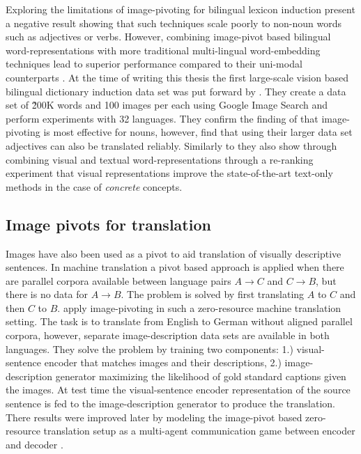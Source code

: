Exploring the limitations of image-pivoting for bilingual lexicon induction
\cite{hartmann2017limitations} present a negative result
showing that such techniques scale poorly to non-noun words such as
adjectives or verbs. However, combining image-pivot based bilingual
word-representations with more traditional multi-lingual word-embedding
techniques lead to superior performance compared to their uni-modal
counterparts \cite{vulic2016multi}. At the time of writing this thesis
the first large-scale vision based bilingual dictionary induction data set
was put forward by \citep{hewitt2018learning}. They create a data set
of \~200K words and 100 images per each using Google Image Search and perform
experiments with 32 languages.
They confirm the finding of \cite{hartmann2017limitations} that image-pivoting
is most effective for nouns, however, find that using their larger data set
adjectives can also be translated reliably. Similarly to \cite{vulic2016multi}
they also show through combining
visual and textual word-representations through a re-ranking
experiment that visual representations improve the state-of-the-art
text-only methods in the case of \emph{concrete} concepts.

\subsection{Image pivots for translation}
\label{sec:imgpivot}

Images have also been used as a pivot to aid translation of visually
descriptive sentences. In machine translation a pivot based approach is applied
when there are parallel corpora available between language pairs $A\rightarrow C$
and $C \rightarrow B$, but there is no data for $A\rightarrow B$. The problem is
solved by first translating $A$ to $C$ and then $C$ to $B$.
\cite{nakayama2017zero} apply image-pivoting in such a zero-resource machine
translation setting. The task is to translate from English to German without
aligned parallel corpora, however, separate image-description data sets are
available in both languages. They solve the problem by
training two components: 1.) visual-sentence encoder that matches images and their descriptions,
2.) image-description generator maximizing the likelihood of gold standard captions given the images.
At test time the visual-sentence encoder representation of the source sentence is fed to the
image-description generator to produce the translation.
There results were improved later by modeling
the image-pivot based zero-resource translation setup as a
multi-agent communication game between encoder and decoder
\citep{chen2018zero,lee2017emergent}.


